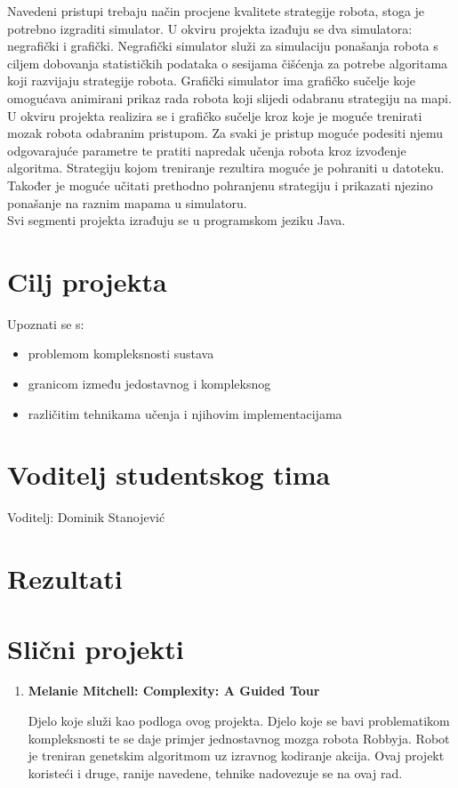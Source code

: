 \documentclass[times, utf8, numeric]{fer}
\begin{document}
\vspace{1ex}
Navedeni pristupi trebaju način procjene kvalitete strategije robota, stoga je potrebno izgraditi simulator. U okviru projekta izađuju se dva simulatora: negrafički i grafički. Negrafički simulator služi za simulaciju ponašanja robota s ciljem dobovanja statističkih podataka o sesijama čišćenja za potrebe algoritama koji razvijaju strategije robota. Grafički simulator ima grafičko sučelje koje omogućava animirani prikaz rada robota koji slijedi odabranu strategiju na mapi.
\vspace{1ex}\\
U okviru projekta realizira se i grafičko sučelje kroz koje je moguće trenirati mozak robota odabranim pristupom. Za svaki je pristup moguće podesiti njemu odgovarajuće parametre te pratiti napredak učenja robota kroz izvođenje algoritma. Strategiju kojom treniranje rezultira moguće je pohraniti u datoteku. Također je moguće učitati prethodno pohranjenu strategiju i prikazati njezino ponašanje na raznim mapama u simulatoru.
\\
Svi segmenti projekta izrađuju se u programskom jeziku Java.

\section{Cilj projekta}
Upoznati se s:
\begin{itemize}
	\item problemom kompleksnosti sustava
	\item granicom između jedostavnog i kompleksnog
	\item različitim tehnikama učenja i njihovim implementacijama
\end{itemize}

\section{Voditelj studentskog tima}
Voditelj: Dominik Stanojević

\section{Rezultati}
\section{Slični projekti}
\begin{enumerate}
\item \begin{flushleft} \textbf{Melanie Mitchell: Complexity: A Guided Tour}\end{flushleft} 
Djelo koje služi kao podloga ovog projekta. Djelo koje se bavi problematikom kompleksnosti te se daje primjer jednostavnog mozga robota Robbyja. Robot je treniran genetskim algoritmom uz izravnog kodiranje akcija. Ovaj projekt koristeći i druge, ranije navedene, tehnike nadovezuje se na ovaj rad.
\end{enumerate}
\end{document}

